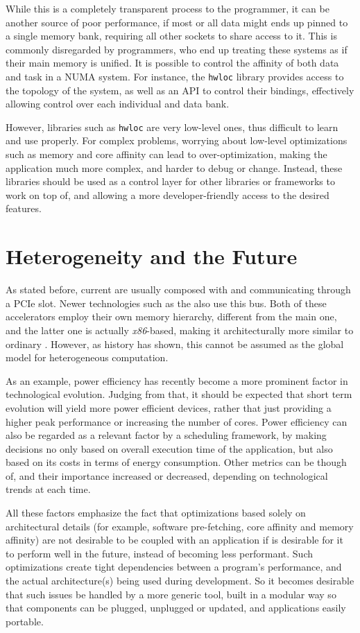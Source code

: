 \documentclass[main.tex]{subfiles}
\begin{document}
While this is a completely transparent process to the programmer, it can be another source of poor performance, if most or all data might ends up pinned to a single memory bank, requiring all other sockets to share access to it. This is commonly disregarded by programmers, who end up treating these systems as if their main memory is unified. It is possible to control the affinity of both data and task in a \acs{NUMA} system. For instance, the \texttt{hwloc}\cite{broquedis2010hwloc} library provides access to the topology of the system, as well as an API to control their bindings, effectively allowing control over each individual \cpu and data bank.

However, libraries such as \texttt{hwloc} are very low-level ones, thus difficult to learn and use properly. For complex problems, worrying about low-level optimizations such as memory and core affinity can lead to over-optimization, making the application much more complex, and harder to debug or change.
Instead, these libraries should be used as a control layer for other libraries or frameworks to work on top of, and allowing a more developer-friendly access to the desired features.

\section{Heterogeneity and the Future}

As stated before, current \hetplats are usually composed with \cpus and \gpus communicating through a \acs{PCIe} slot. Newer technologies such as the \intel \mic also use this bus. Both of these accelerators employ their own memory hierarchy, different from the main one, and the latter one is actually \textit{x86}-based, making it architecturally more similar to ordinary \cpus. However, as history has shown, this cannot be assumed as the global model for heterogeneous computation.

As an example, power efficiency has recently become a more prominent factor in technological evolution. Judging from that, it should be expected that short term evolution will yield more power efficient devices, rather that just providing a higher peak performance or increasing the number of cores. Power efficiency can also be regarded as a relevant factor by a scheduling framework, by making decisions no only based on overall execution time of the application, but also based on its costs in terms of energy consumption.
Other metrics can be though of, and their importance increased or decreased, depending on technological trends at each time.

All these factors emphasize the fact that optimizations based solely on architectural details (for example, software pre-fetching, core affinity and memory affinity) are not desirable to be coupled with an application if is desirable for it to perform well in the future, instead of becoming less performant. Such optimizations create tight dependencies between a program's performance, and the actual architecture(s) being used during development. So it becomes desirable that such issues be handled by a more generic tool, built in a modular way so that components can be plugged, unplugged or updated, and applications easily portable.
\end{document}
